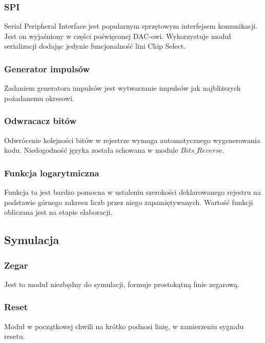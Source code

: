 \documentclass[a4paper,12pt]{article}
\begin{document}
\subsubsection{SPI}
Serial Peripheral Interface jest popularnym sprzętowym interfejsem komunikacji. Jest on wyjaśniony w części poświęconej DAC-owi. Wykorzystuje moduł serializacji dodając jedynie funcjonalność lini Chip Select.


\subsubsection{Generator impulsów}
Zadaniem generatora impulsów jest wytwarzanie impulsów jak najbliższych pożadanemu okresowi.


\subsubsection{Odwracacz bitów}
Odwrócenie kolejności bitów w rejestrze wymaga automatycznego wygenerowania kodu. Niedogodność języka została schowana w module $Bits\_Reverse$.


\subsubsection{Funkcja logarytmiczna}
Funkcja ta jest bardzo pomocna w ustaleniu szerokości deklarowanego rejestru na podstawie górnego zakresu liczb przez niego zapamiętywanych. Wartość funkcji obliczana jest na etapie elaboracji.


\subsection{Symulacja}

\subsubsection{Zegar}
Jest to moduł niezbędny do symulacji, formuje prostokątną linie zegarową.


\subsubsection{Reset}
Moduł w początkowej chwili na krótko podnosi linię, w zamierzeniu sygnału resetu.

\end{document}
